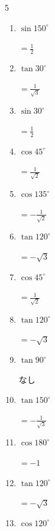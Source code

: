 \begin{multicols}{5}
\begin{enumerate}
        $\displaystyle =-\frac{1}{\sqrt{3}}$

  \item $\displaystyle \sin{150^\circ}$

        $\displaystyle =\frac{1}{2}$

  \item $\displaystyle \tan{30^\circ}$

        $\displaystyle =\frac{1}{\sqrt{3}}$

  \item $\displaystyle \sin{30^\circ}$

        $\displaystyle =\frac{1}{2}$

  \item $\displaystyle \cos{45^\circ}$

        $\displaystyle =\frac{1}{\sqrt{2}}$

  \item $\displaystyle \cos{135^\circ}$

        $\displaystyle =-\frac{1}{\sqrt{2}}$

\columnbreak %

  \item $\displaystyle \tan{120^\circ}$

        $\displaystyle =-\sqrt{3}$

  \item $\displaystyle \cos{45^\circ}$

        $\displaystyle =\frac{1}{\sqrt{2}}$

  \item $\displaystyle \tan{120^\circ}$

        $\displaystyle =-\sqrt{3}$

  \item $\displaystyle \tan{90^\circ}$

        $\displaystyle なし$

  \item $\displaystyle \tan{150^\circ}$

        $\displaystyle =-\frac{1}{\sqrt{3}}$

  \item $\displaystyle \cos{180^\circ}$

        $\displaystyle =-1$

  \item $\displaystyle \tan{120^\circ}$

        $\displaystyle =-\sqrt{3}$

  \item $\displaystyle \cos{120^\circ}$


\end{enumerate}
\end{multicols}
